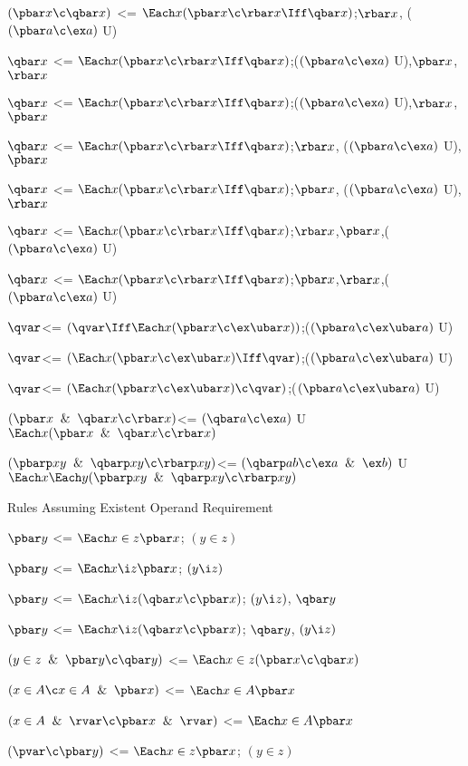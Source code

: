 $(\pbar x \c \qbar x)$ <= $\Each x (\pbar x \c \rbar x\Iff \qbar x)$;$\rbar x$, ($(\pbar a \c \ex a)$ U)

$\qbar x$ <= $\Each x (\pbar x \c \rbar x\Iff \qbar x)$;($(\pbar a \c \ex a)$ U),$\pbar x$,$\rbar x$

$\qbar x$ <= $\Each x (\pbar x \c \rbar x\Iff \qbar x)$;($(\pbar a \c \ex a)$ U),$\rbar x$,$\pbar x$

$\qbar x$ <= $\Each x (\pbar x \c \rbar x\Iff \qbar x)$;$\rbar x$, ($(\pbar a \c \ex a)$ U),$\pbar x$

$\qbar x$ <= $\Each x (\pbar x \c \rbar x\Iff \qbar x)$;$\pbar x$, ($(\pbar a \c \ex a)$ U),$\rbar x$

$\qbar x$ <= $\Each x (\pbar x \c \rbar x\Iff \qbar x)$;$\rbar x$,$\pbar x$,($(\pbar a \c \ex a)$ U)

$\qbar x$ <= $\Each x (\pbar x \c \rbar x\Iff \qbar x)$;$\pbar x$,$\rbar x$,($(\pbar a \c \ex a)$ U)

$\qvar$<= $(\qvar \Iff \Each x(\pbar x \c \ex \ubar x))$;($(\pbar a \c \ex\ubar a)$ U)

$\qvar$<= $(\Each x(\pbar x \c \ex \ubar x)\Iff \qvar)$;($(\pbar a \c \ex\ubar a)$ U)

$\qvar$<= $(\Each x(\pbar x \c \ex \ubar x)\c \qvar)$;($(\pbar a \c \ex\ubar a)$ U)

$(\pbar x \And \qbar x \c \rbar x)$<= $(\qbar a \c \ex a )$ U $\Each x (\pbar x \And \qbar x \c \rbar x)$

$(\pbarp xy \And \qbarp xy \c \rbarp xy)$<= $(\qbarp ab \c \ex a \And \ex b)$ U $\Each x \Each y (\pbarp xy \And \qbarp xy \c \rbarp xy)$

Rules Assuming Existent Operand Requirement
\lineb

$\pbar y$ <= $\Each x \in z \pbar x$; $(y \in z)$ 

$\pbar y$ <= $\Each x \i z \pbar x$; $(y \i z)$ 

$\pbar y$ <= $\Each x \i z (\qbar x \c \pbar x)$; $(y \i z)$, $\qbar y$

$\pbar y$ <= $\Each x \i z (\qbar x \c \pbar x)$; $\qbar y$, $(y \i z)$ 

$(y \in z \And \pbar y \c \qbar y)$ <= $\Each x \in z (\pbar x \c \qbar x)$

$(x \in A \c x \in A \And \pbar x)$ <= $\Each x \in A \pbar x$

$(x \in A \And \rvar \c \pbar x \And \rvar)$ <= $\Each x \in A \pbar x$

$(\pvar \c \pbar y)$ <= $\Each x \in z \pbar x$; $(y \in z)$ 

